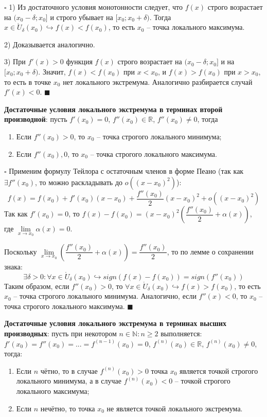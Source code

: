 \documentclass[12pt, a4paper, reqno]{article}
\begin{document}
    $\square$ 1) Из достаточного условия монотонности следует, что $f(x)$ строго возрастает на
    $(x_0 - \delta; x_0]$ и строго убывает на $[x_0; x_0 + \delta)$. Тогда
    $x\in\mathring U_{\delta}(x_0)\hookrightarrow f(x) < f(x_0)$, то есть $x_0$ -- точка локального
    максимума.

    2) Доказывается аналогично.

    3) При $f'(x) > 0$ функция $f(x)$ строго возрастает на $(x_0 - \delta; x_0]$ и на
    $[x_0; x_0 + \delta)$. Значит, $f(x) < f(x_0)$ при $x < x_0$, и $f(x) > f(x_0)$ при $x > x_0$,
    то есть в точке $x_0$ нет локального экстремума. Аналогично разбирается случай $f'(x) < 0$.
    $\blacksquare$

    \textbf{Достаточные условия локального экстремума в терминах второй производной}: пусть
    $f'(x_0) = 0$, $f''(x_0)\in\mathbb{R}$, $f''(x_0)\neq 0$, тогда
    \begin{enumerate}
        \item Если $f''(x_0) > 0$, то $x_0$ -- точка строгого локального минимума;
        \item Если $f''(x_0) , 0$, то $x_0$ -- точка строгого локального максимума.
    \end{enumerate}

    $\square$ Применим формулу Тейлора с остаточным членов в форме Пеано (так как $\exists f''(x_0)$,
    то можно раскладывать до $o\left((x - x_0)^2\right)$):
    \begin{equation*}
        f(x) = f(x_0) + f'(x_0)(x - x_0) + \dfrac{f''(x_0)}{2}(x - x_0)^2 + o\left((x - x_0)^2\right)
    \end{equation*}
    Так как $f'(x_0) = 0$, то $f(x) - f(x_0) = (x - x_0)^2\left(\dfrac{f''(x_0)}{2} + \alpha(x)\right)$,
    где $\lim\limits_{x\to x_0} \alpha(x) = 0$.

    Поскольку $\lim\limits_{x\to x_0} \left(\dfrac{f''(x_0)}{2} + \alpha(x)\right) =
    \dfrac{f''(x_0)}{2}$, то по лемме о сохранении знака:
    \begin{equation*}
        \exists\delta > 0: \forall x\in\mathring U_{\delta}(x_0)\hookrightarrow
        sign(f(x) - f(x_0)) = sign(f''(x_0))
    \end{equation*}
    Таким образом, если $f''(x_0) > 0$, то $\forall x\in\mathring U_{\delta}(x_0)\hookrightarrow
    f(x) > f(x_0)$, то есть $x_0$ -- точка строгого локального минимума. Аналогично, если
    $f''(x) < 0$, то $x_0$ -- точка строгого локального максимума. $\blacksquare$

    \textbf{Достаточные условия локального экстремума в терминах высших производных}: пусть при
    некотором $n\in\mathbb{N}: n\geq 2$ выполняется: $f'(x_0) = f''(x_0) = ... = f^{(n - 1)}(x_0) = 0$,
    $f^{(n)}(x_0)\in\mathbb{R}$, $f^{(n)}(x_0)\neq 0$, тогда:
    \begin{enumerate}
        \item Если $n$ чётно, то в случае $f^{(n)}(x_0) > 0$ точка $x_0$ является точкой строгого
        локального минимума, а в случае $f^{(n)}(x_0) < 0$ -- точкой строгого локального максимума;
        \item Если $n$ нечётно, то точка $x_0$ не является точкой локального экстремума.
    \end{enumerate}
\end{document}
